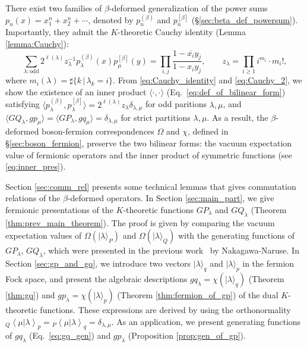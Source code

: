 \documentclass{amsart}
\def\ket#1{\vert #1 \rangle}
\def\inner#1#2{\left\langle #1|#2\right\rangle}
\begin{document}
There exist two families of $\beta$-deformed generalization of the power sums $p_n(x)=x_1^n+x_2^n+\cdots$, denoted by $p^{(\beta)}_n$ and $p^{[\beta]}_n$ (\S \ref{sec:beta_def_powersum}).
Importantly, they admit the $K$-theoretic Cauchy identity (Lemma \ref{lemma:Cauchy}):
\begin{equation}\label{eq:Cauchy_2}
\sum_{\lambda:\mathrm{odd}}2^{\ell(\lambda)}z_\lambda^{-1}
p_\lambda^{(\beta)}(x)p_\mu^{[\beta]}(y)=
\prod_{i,j}\frac{1-\overline{x_i}y_j}{1-x_iy_j},\qquad z_\lambda=\prod_{i\geq 1}i^{m_i}\cdot m_i!,
\end{equation}
where $m_i(\lambda)=\sharp\{k\,|\,\lambda_k=i\}$.
From \eqref{eq:Cauchy_identity} and \eqref{eq:Cauchy_2}, we show the existence of an inner product $\langle\cdot,\cdot\rangle$ (Eq.~\eqref{eq:def_of_bilinear_form}) satisfying $\langle p^{(\beta)}_\lambda,p^{[\beta]}_\lambda\rangle=2^{\ell(\lambda)}z_\lambda\delta_{\lambda,\mu}$ for odd paritions $\lambda,\mu$, and $\langle GQ_\lambda,gp_\mu\rangle=\langle GP_\lambda,gq_\mu\rangle=\delta_{\lambda,\mu}$ for strict partitions $\lambda,\mu$.
As a result, the $\beta$-deformed boson-fermion correspondences $\Omega$ and $\chi$, defined in \S \ref{sec:boson_fermion}, preserve the two bilinear forms: the vacuum expectation value of fermionic operators and the inner product of symmetric functions (see \eqref{eq:inner_pres}).

Section \ref{sec:comm_rel} presents some technical lemmas that gives commutation relations of the $\beta$-deformed operators.
In Section \ref{sec:main_part}, we give fermionic presentations of the $K$-theoretic functions $GP_\lambda$ and $GQ_\lambda$ (Theorem \ref{thm:prev_main_theorem}).
The proof is given by comparing the vacuum expectation values of $\Omega(\ket{\lambda}_P)$ and $\Omega(\ket{\lambda}_Q)$ with the generating functions of $GP_\lambda$, $GQ_\lambda$, which were presented in the previous work~\cite{nakagawa2018universalfactrial} by Nakagawa-Naruse.
In Section \ref{sec:gp_and_gq}, we introduce two vectors $\ket{\lambda}_q$ and $\ket{\lambda}_p$ in the fermion Fock space, and present the algebraic descriptions $gq_{\lambda}=\chi(\ket{\lambda}_q)$ (Theorem \ref{thm:gq}) and $gp_{\lambda}=\chi(\ket{\lambda}_p)$ (Theorem \ref{thm:fermion_of_gp}) of the dual $K$-theoretic functions.
These expressions are derived by using the orthonormality ${}_Q\inner{\mu}{\lambda}_p={}_P\inner{\mu}{\lambda}_q=\delta_{\lambda,\mu}$.
As an application, we present generating functions of $gq_\lambda$ (Eq.~\eqref{eq:gq_gen}) and $gp_\lambda$ (Proposition \ref{prop:gen_of_gp}).
\end{document}
